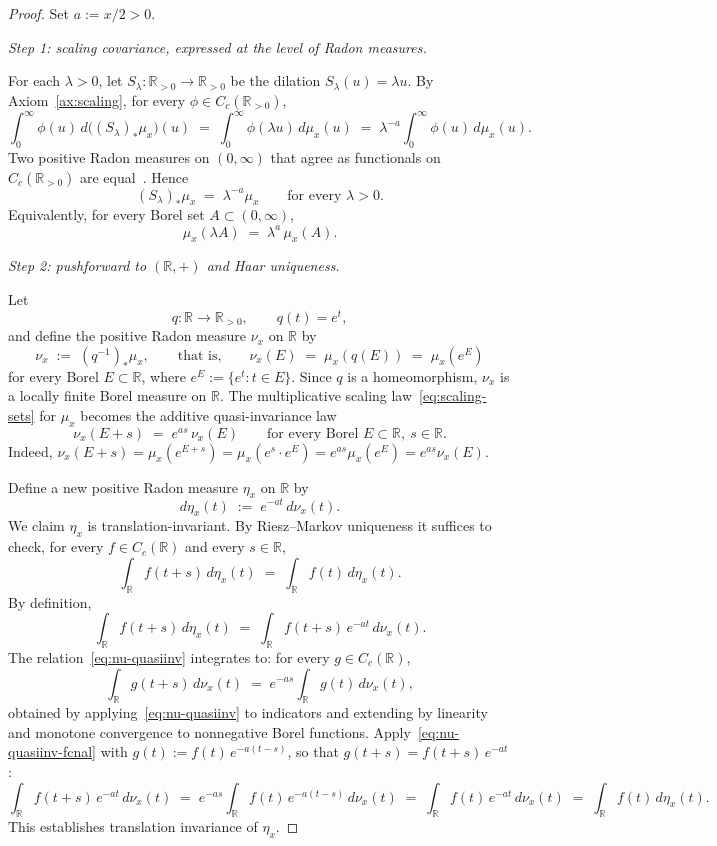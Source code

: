 \documentclass[11pt,a4paper]{article}
\theoremstyle{plain}
\theoremstyle{definition}
\theoremstyle{remark}
\newcommand{\R}{\mathbb{R}}
\newcommand{\Cc}{C_c}
\begin{document}
\begin{proof}
Set $a := x/2 > 0$.

\smallskip
\emph{Step 1: scaling covariance, expressed at the level of Radon measures.}

For each $\lambda > 0$, let $S_\lambda\colon\R_{>0}\to\R_{>0}$ be the dilation $S_\lambda(u) = \lambda u$. By Axiom~\ref{ax:scaling}, for every $\phi\in\Cc(\R_{>0})$,
\[
\int_0^\infty \phi(u)\,d\bigl((S_\lambda)_*\mu_x\bigr)(u)
\;=\;
\int_0^\infty \phi(\lambda u)\,d\mu_x(u)
\;=\;
\lambda^{-a}\int_0^\infty \phi(u)\,d\mu_x(u).
\]
Two positive Radon measures on $(0,\infty)$ that agree as functionals on $\Cc(\R_{>0})$ are equal~\cite[Thm.~7.2]{Folland1999}. Hence
\begin{equation}\label{eq:pushforward-scaling}
(S_\lambda)_*\mu_x \;=\; \lambda^{-a}\mu_x \qquad\text{for every } \lambda>0.
\end{equation}
Equivalently, for every Borel set $A\subset(0,\infty)$,
\begin{equation}\label{eq:scaling-sets}
\mu_x(\lambda A) \;=\; \lambda^a\,\mu_x(A).
\end{equation}

\smallskip
\emph{Step 2: pushforward to $(\R,+)$ and Haar uniqueness.}

Let
\[
q\colon\R\to\R_{>0}, \qquad q(t)=e^t,
\]
and define the positive Radon measure $\nu_x$ on $\R$ by
\[
\nu_x \;:=\; (q^{-1})_*\mu_x,
\qquad\text{that is,}\qquad \nu_x(E)\;=\;\mu_x(q(E))\;=\;\mu_x(e^E)
\]
for every Borel $E\subset\R$, where $e^E:=\{e^t:t\in E\}$. Since $q$ is a homeomorphism, $\nu_x$ is a locally finite Borel measure on $\R$. The multiplicative scaling law~\eqref{eq:scaling-sets} for $\mu_x$ becomes the additive quasi-invariance law
\begin{equation}\label{eq:nu-quasiinv}
\nu_x(E + s) \;=\; e^{a s}\,\nu_x(E) \qquad\text{for every Borel } E\subset\R,\ s\in\R.
\end{equation}
Indeed, $\nu_x(E+s) = \mu_x(e^{E+s}) = \mu_x(e^s\cdot e^E) = e^{as}\mu_x(e^E) = e^{as}\nu_x(E)$.

Define a new positive Radon measure $\eta_x$ on $\R$ by
\[
d\eta_x(t) \;:=\; e^{-a t}\,d\nu_x(t).
\]
We claim $\eta_x$ is translation-invariant. By Riesz--Markov uniqueness it suffices to check, for every $f\in C_c(\R)$ and every $s\in\R$,
\[
\int_\R f(t+s)\,d\eta_x(t) \;=\; \int_\R f(t)\,d\eta_x(t).
\]
By definition,
\[
\int_\R f(t+s)\,d\eta_x(t) \;=\; \int_\R f(t+s)\,e^{-a t}\,d\nu_x(t).
\]
The relation~\eqref{eq:nu-quasiinv} integrates to: for every $g\in C_c(\R)$,
\begin{equation}\label{eq:nu-quasiinv-fcnal}
\int_\R g(t+s)\,d\nu_x(t) \;=\; e^{-a s}\int_\R g(t)\,d\nu_x(t),
\end{equation}
obtained by applying~\eqref{eq:nu-quasiinv} to indicators and extending by linearity and monotone convergence to nonnegative Borel functions. Apply~\eqref{eq:nu-quasiinv-fcnal} with $g(t) := f(t)\,e^{-a(t-s)}$, so that $g(t+s) = f(t+s)\,e^{-a t}$:
\[
\int_\R f(t+s)\,e^{-a t}\,d\nu_x(t) \;=\; e^{-a s}\int_\R f(t)\,e^{-a(t-s)}\,d\nu_x(t) \;=\; \int_\R f(t)\,e^{-a t}\,d\nu_x(t) \;=\; \int_\R f(t)\,d\eta_x(t).
\]
This establishes translation invariance of $\eta_x$.


\end{proof}
\end{document}

